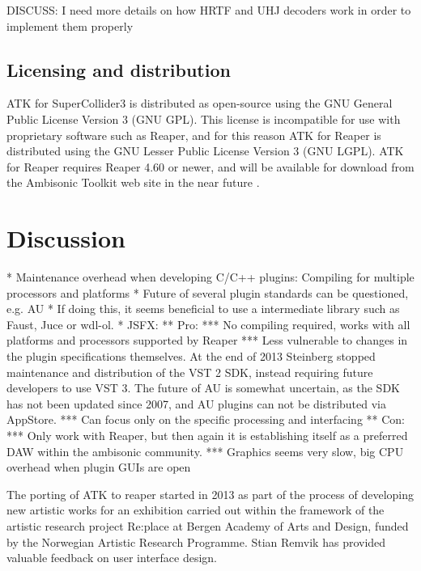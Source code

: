 \documentclass{article}
\begin{document}
DISCUSS: I need more details on how HRTF and UHJ decoders work in order to implement them properly




\subsection{Licensing and distribution}\label{sec:license}

ATK for SuperCollider3 is distributed as open-source using the GNU General Public License Version 3 (GNU GPL). This license is incompatible for use with proprietary software such as Reaper, and for this reason ATK for Reaper is distributed using the GNU Lesser Public License Version 3 (GNU LGPL).
ATK for Reaper requires Reaper 4.60 or newer, and will be available for download from the Ambisonic Toolkit web site in the near future \cite{ambisonictoolkit.net:2014}.



\section{Discussion}\label{sec:discussion}

* Maintenance overhead when developing C/C++ plugins: Compiling for multiple processors and platforms
* Future of several plugin standards can be questioned, e.g. AU
* If doing this, it seems beneficial to use a intermediate library such as Faust, Juce or wdl-ol.
* JSFX: 
** Pro:
*** No compiling required, works with all platforms and processors supported by Reaper
*** Less vulnerable to changes in the plugin specifications themselves. At the end of 2013 Steinberg stopped maintenance and distribution of the VST 2 SDK, instead requiring future developers to use VST 3. The future of AU is somewhat uncertain, as the SDK has not been updated since 2007, and AU plugins can not be distributed via AppStore.
*** Can focus only on the specific processing and interfacing 
** Con:
*** Only work with Reaper, but then again it is establishing itself as a preferred DAW within the ambisonic community.
*** Graphics seems very slow, big CPU overhead when plugin GUIs are open




\begin{acknowledgments}
The porting of ATK to reaper started in 2013 as part of the process of developing new artistic works for an exhibition carried out within the framework of the artistic research project Re:place at Bergen Academy of Arts and Design, funded by the Norwegian Artistic Research Programme.
Stian Remvik has provided valuable feedback on user interface design.
\end{acknowledgments} 


\end{document}
